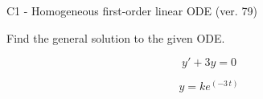 \begin{exercise}
  \begin{exerciseTitle}C1 - Homogeneous first-order linear ODE (ver. 79)\end{exerciseTitle}
  \begin{exerciseStatement}
    
Find the general solution to the given ODE.

    
\[y'+3y=0\]

  \end{exerciseStatement}
  \begin{exerciseAnswer}
    
\[y= k e^{\left(-3 \, t\right)}\]

  \end{exerciseAnswer}
\end{exercise}